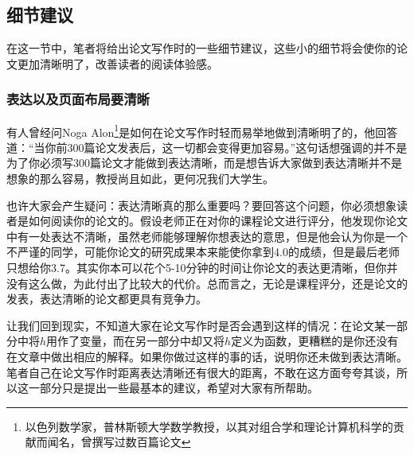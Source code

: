 \documentclass{formatBook}
\begin{document}
\subsection{细节建议}
在这一节中，笔者将给出论文写作时的一些细节建议，这些小的细节将会使你的论文更加清晰明了，改善读者的阅读体验感。
\subsubsection{表达以及页面布局要清晰}
有人曾经问Noga Alon\footnote{以色列数学家，普林斯顿大学数学教授，以其对组合学和理论计算机科学的贡献而闻名，曾撰写过数百篇论文}是如何在论文写作时轻而易举地做到清晰明了的，他回答道：“当你前300篇论文发表后，这一切都会变得更加容易。”这句话想强调的并不是为了你必须写300篇论文才能做到表达清晰，而是想告诉大家做到表达清晰并不是想象的那么容易，教授尚且如此，更何况我们大学生。\par
也许大家会产生疑问：表达清晰真的那么重要吗？要回答这个问题，你必须想象读者是如何阅读你的论文的。假设老师正在对你的课程论文进行评分，他发现你论文中有一处表达不清晰，虽然老师能够理解你想表达的意思，但是他会认为你是一个不严谨的同学，可能你论文的研究成果本来能使你拿到4.0的成绩，但是最后老师只想给你3.7。其实你本可以花个5-10分钟的时间让你论文的表达更清晰，但你并没有这么做，为此付出了比较大的代价。总而言之，无论是课程评分，还是论文的发表，表达清晰的论文都更具有竞争力。\par
让我们回到现实，不知道大家在论文写作时是否会遇到这样的情况：在论文某一部分中将$h$用作了变量，而在另一部分中却又将$h$定义为函数，更糟糕的是你还没有在文章中做出相应的解释。如果你做过这样的事的话，说明你还未做到表达清晰。笔者自己在论文写作时距离表达清晰还有很大的距离，不敢在这方面夸夸其谈，所以这一部分只是提出一些最基本的建议，希望对大家有所帮助。
\end{document}
